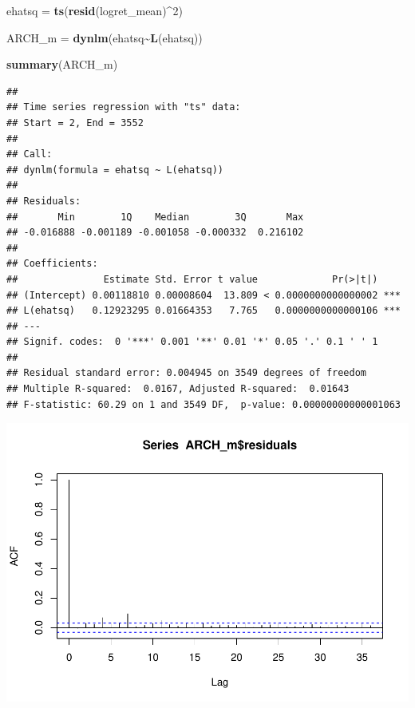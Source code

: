 \documentclass[
]{book}
\newenvironment{Shaded}{\begin{snugshade}}{\end{snugshade}}
\newcommand{\DecValTok}[1]{\textcolor[rgb]{0.00,0.00,0.81}{#1}}
\newcommand{\FunctionTok}[1]{\textcolor[rgb]{0.13,0.29,0.53}{\textbf{#1}}}
\newcommand{\NormalTok}[1]{#1}
\newcommand{\OtherTok}[1]{\textcolor[rgb]{0.56,0.35,0.01}{#1}}
\newcommand{\SpecialCharTok}[1]{\textcolor[rgb]{0.81,0.36,0.00}{\textbf{#1}}}
\begin{document}
\begin{Shaded}
\begin{Highlighting}[]
\NormalTok{ehatsq }\OtherTok{=} \FunctionTok{ts}\NormalTok{(}\FunctionTok{resid}\NormalTok{(logret\_mean)}\SpecialCharTok{\^{}}\DecValTok{2}\NormalTok{)}

\NormalTok{ARCH\_m }\OtherTok{=} \FunctionTok{dynlm}\NormalTok{(ehatsq}\SpecialCharTok{\textasciitilde{}}\FunctionTok{L}\NormalTok{(ehatsq))}

\FunctionTok{summary}\NormalTok{(ARCH\_m)}
\end{Highlighting}
\end{Shaded}

\begin{verbatim}
## 
## Time series regression with "ts" data:
## Start = 2, End = 3552
## 
## Call:
## dynlm(formula = ehatsq ~ L(ehatsq))
## 
## Residuals:
##       Min        1Q    Median        3Q       Max 
## -0.016888 -0.001189 -0.001058 -0.000332  0.216102 
## 
## Coefficients:
##               Estimate Std. Error t value             Pr(>|t|)    
## (Intercept) 0.00118810 0.00008604  13.809 < 0.0000000000000002 ***
## L(ehatsq)   0.12923295 0.01664353   7.765   0.0000000000000106 ***
## ---
## Signif. codes:  0 '***' 0.001 '**' 0.01 '*' 0.05 '.' 0.1 ' ' 1
## 
## Residual standard error: 0.004945 on 3549 degrees of freedom
## Multiple R-squared:  0.0167, Adjusted R-squared:  0.01643 
## F-statistic: 60.29 on 1 and 3549 DF,  p-value: 0.00000000000001063
\end{verbatim}

\begin{Shaded}
\end{Shaded}

\includegraphics{Notas-Series-Tiempo_files/figure-latex/ArchTest-1.pdf}
\end{document}

